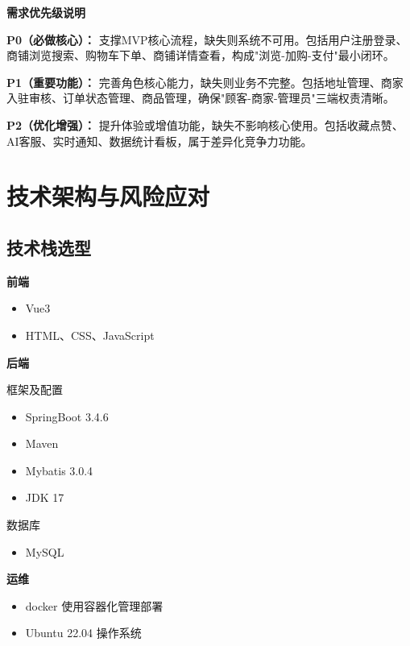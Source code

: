 \begin{levellist}
    \item \textbf{需求优先级说明}
    \begin{levellist}
        \item \textbf{P0（必做核心）：} 支撑MVP核心流程，缺失则系统不可用。包括用户注册登录、商铺浏览搜索、购物车下单、商铺详情查看，构成"浏览-加购-支付"最小闭环。
        \item \textbf{P1（重要功能）：} 完善角色核心能力，缺失则业务不完整。包括地址管理、商家入驻审核、订单状态管理、商品管理，确保"顾客-商家-管理员"三端权责清晰。
        \item \textbf{P2（优化增强）：} 提升体验或增值功能，缺失不影响核心使用。包括收藏点赞、AI客服、实时通知、数据统计看板，属于差异化竞争力功能。
    \end{levellist}

\end{levellist}

\section{技术架构与风险应对}

\subsection{技术栈选型}

\begin{levellist}
    \item \textbf{前端}
    \begin{itemize}
        \item Vue3
        \item HTML、CSS、JavaScript
    \end{itemize}

    \item \textbf{后端}
    \begin{levellist}
        \item 框架及配置
        \begin{itemize}
            \item SpringBoot 3.4.6
            \item Maven
            \item Mybatis 3.0.4
            \item JDK 17
        \end{itemize}

        \item 数据库
        \begin{itemize}
            \item MySQL
        \end{itemize}
    \end{levellist}

    \item \textbf{运维}
    \begin{itemize}
        \item docker 使用容器化管理部署
        \item Ubuntu 22.04 操作系统
    \end{itemize}

\end{levellist}


